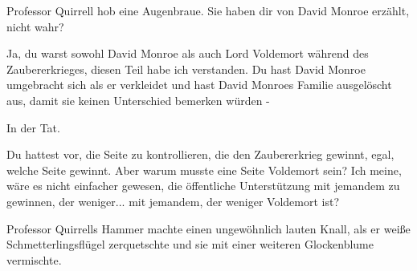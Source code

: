 Professor Quirrell hob eine Augenbraue. \glqq Sie haben dir von David Monroe
erzählt, nicht wahr?\grqq{}

\glqq Ja, du warst sowohl David Monroe als auch Lord Voldemort während des
Zaubererkrieges, diesen Teil habe ich verstanden. Du hast David Monroe
umgebracht sich als er verkleidet und hast David Monroes Familie ausgelöscht
aus, damit sie keinen Unterschied bemerken würden -\grqq{}

\glqq In der Tat.\grqq{}

\glqq Du hattest vor, die Seite zu kontrollieren, die den Zaubererkrieg gewinnt,
egal, welche Seite gewinnt. Aber warum musste eine Seite Voldemort sein? Ich
meine, wäre es nicht einfacher gewesen, die öffentliche Unterstützung mit
jemandem zu gewinnen, der weniger... mit jemandem, der weniger Voldemort
ist?\grqq{}

Professor Quirrells Hammer machte einen ungewöhnlich lauten Knall, als er weiße
Schmetterlingsflügel zerquetschte und sie mit einer weiteren Glockenblume
vermischte.

